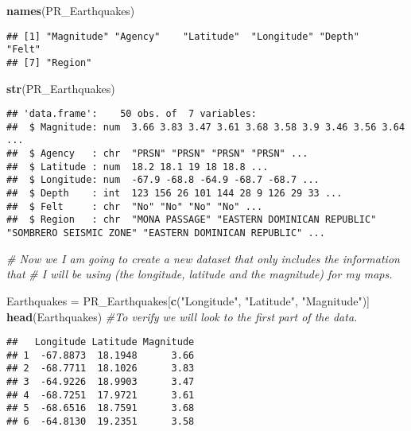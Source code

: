 \documentclass[]{article}
\newenvironment{Shaded}{\begin{snugshade}}{\end{snugshade}}
\newcommand{\KeywordTok}[1]{\textcolor[rgb]{0.13,0.29,0.53}{\textbf{#1}}}
\newcommand{\StringTok}[1]{\textcolor[rgb]{0.31,0.60,0.02}{#1}}
\newcommand{\CommentTok}[1]{\textcolor[rgb]{0.56,0.35,0.01}{\textit{#1}}}
\newcommand{\NormalTok}[1]{#1}
\begin{document}
\begin{Shaded}
\begin{Highlighting}[]
\KeywordTok{names}\NormalTok{(PR_Earthquakes)}
\end{Highlighting}
\end{Shaded}

\begin{verbatim}
## [1] "Magnitude" "Agency"    "Latitude"  "Longitude" "Depth"     "Felt"     
## [7] "Region"
\end{verbatim}

\begin{Shaded}
\begin{Highlighting}[]
\KeywordTok{str}\NormalTok{(PR_Earthquakes)}
\end{Highlighting}
\end{Shaded}

\begin{verbatim}
## 'data.frame':    50 obs. of  7 variables:
##  $ Magnitude: num  3.66 3.83 3.47 3.61 3.68 3.58 3.9 3.46 3.56 3.64 ...
##  $ Agency   : chr  "PRSN" "PRSN" "PRSN" "PRSN" ...
##  $ Latitude : num  18.2 18.1 19 18 18.8 ...
##  $ Longitude: num  -67.9 -68.8 -64.9 -68.7 -68.7 ...
##  $ Depth    : int  123 156 26 101 144 28 9 126 29 33 ...
##  $ Felt     : chr  "No" "No" "No" "No" ...
##  $ Region   : chr  "MONA PASSAGE" "EASTERN DOMINICAN REPUBLIC" "SOMBRERO SEISMIC ZONE" "EASTERN DOMINICAN REPUBLIC" ...
\end{verbatim}

\begin{Shaded}
\begin{Highlighting}[]
\CommentTok{# Now we I am going to create a new dataset that only includes the information that }
\CommentTok{# I will be using (the longitude, latitude and the magnitude) for my maps. }

\NormalTok{Earthquakes =}\StringTok{ }\NormalTok{PR_Earthquakes[}\KeywordTok{c}\NormalTok{(}\StringTok{"Longitude"}\NormalTok{, }\StringTok{"Latitude"}\NormalTok{, }\StringTok{"Magnitude"}\NormalTok{)]}
\KeywordTok{head}\NormalTok{(Earthquakes) }\CommentTok{#To verify we will look to the first part of the data. }
\end{Highlighting}
\end{Shaded}

\begin{verbatim}
##   Longitude Latitude Magnitude
## 1  -67.8873  18.1948      3.66
## 2  -68.7711  18.1026      3.83
## 3  -64.9226  18.9903      3.47
## 4  -68.7251  17.9721      3.61
## 5  -68.6516  18.7591      3.68
## 6  -64.8130  19.2351      3.58
\end{verbatim}
\end{document}
